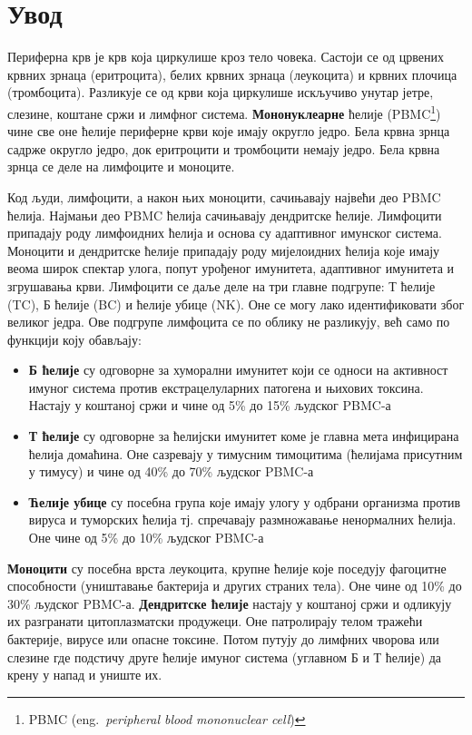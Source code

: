 \documentclass[10pt, a4paper]{article}
\begin{document}
\setlength{\parskip}{0.5em}

\section{Увод}
\label{sec:uvod}

Периферна крв је крв која циркулише кроз тело човека. Састоји се од црвених крвних зрнаца (еритроцита), белих крвних зрнаца (леукоцита) и крвних плочица (тромбоцита). Разликује се од крви која циркулише искључиво унутар јетре, слезине, коштане сржи и лимфног система. \textbf{Мононуклеарне} ћелије (PBMC\footnote{PBMC (eng.~{\em peripheral blood mononuclear cell})}) чине све оне ћелије периферне крви које имају округло једро. Бела крвна зрнца садрже округло једро, док еритроцити и тромбоцити немају једро.  Бела крвна зрнца се деле на лимфоците и моноците.

Код људи, лимфоцити, а након њих моноцити, сачињавају највећи део PBMC ћелија. Најмањи део PBMC ћелија сачињавају дендритске ћелије. Лимфоцити припадају роду лимфоидних ћелија и основа су адаптивног имунског система. Моноцити и дендритске ћелије припадају роду мијелоидних ћелија које имају веома широк спектар улога, попут урођеног имунитета, адаптивног имунитета и згрушавања крви. Лимфоцити се даље деле на три главне подгрупе: Т ћелије (TC), Б ћелије (BC) и ћелије убице (NK). Оне се могу лако идентификовати због великог једра. Ове подгрупе лимфоцита се по облику не разликују, већ само по функцији коју обављају:

\begin{itemize}
\item\textbf{Б ћелије} су одговорне за хуморални имунитет који се односи на активност имуног система против екстрацелуларних патогена и њихових токсина. Настају у коштаној сржи и чине од 5\% до 15\% људског PBMC-а
\item\textbf{Т ћелије} су одговорне за ћелијски имунитет коме је главна мета инфицирана ћелија домаћина. Оне сазревају у тимусним тимоцитима (ћелијама присутним у тимусу) и чине од 40\% до 70\% људског PBMC-а
\item\textbf{Ћелије убице} су посебна група које имају улогу у одбрани организма против вируса и туморских ћелија тј. спречавају размножавање ненормалних ћелија. Оне чине од 5\% до 10\% људског PBMC-а
\end{itemize}

\textbf{Моноцити} су посебна врста леукоцита, крупне ћелије које поседују фагоцитне способности (уништавање бактерија и других страних тела). Оне чине од 10\% до 30\% људског PBMC-а.
\textbf{Дендритске ћелије} настају у коштаној сржи и одликују их разгранати цитоплазматски продужеци. Оне патролирају телом тражећи бактерије, вирусе или опасне токсине. Потом путују до лимфних чворова или слезине где подстичу друге ћелије имуног система (углавном Б и Т ћелије) да крену у напад и униште их.
\end{document}
